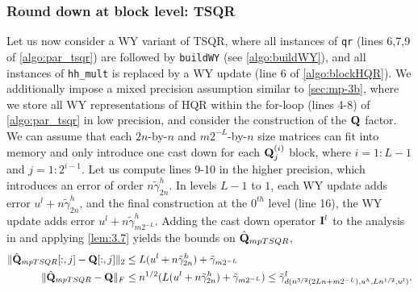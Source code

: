 \subsubsection{Round down at block level: TSQR}\label{sec:mp-3t}
Let us now consider a WY variant of TSQR, where all instances of {\tt qr} (lines 6,7,9 of \cref{algo:par_tsqr}) are followed by {\tt buildWY} (see \cref{algo:buildWY}), and all instances of {\tt hh\_mult} is replaced by a WY update (line 6 of \cref{algo:blockHQR}).
We additionally impose a mixed precision assumption similar to \cref{sec:mp-3b}, where we store all WY representations of HQR within the for-loop (lines 4-8) of \cref{algo:par_tsqr} in low precision, and consider the construction of the $\mathbf{Q}$ factor.
We can assume that each $2n$-by-$n$ and $m2^{-L}$-by-$n$ size matrices can fit into memory and only introduce one cast down for each $\mathbf{Q}_j^{(i)}$ block, where $i=1:L-1$ and $j=1:2^{i-1}$.
Let us compute lines 9-10 in the higher precision, which introduces an error of order $n\tilde{\gamma}_{2n}^h$.
In levels $L-1$ to $1$, each WY update adds error $u^l+n\tilde{\gamma}_{2n}^h$, and the final construction at the $0^{th}$ level (line 16), the WY update adds error $u^l + n\tilde{\gamma}_{m2^{-L}}^h$.
Adding the cast down operator $\mathbf{I}^l$ to the analysis in \cite{Mori2012} and applying \cref{lem:3.7} yields the bounds on $\hat{\mathbf{Q}}_{mpTSQR}$,
\begin{align}
\|\hat{\bb{Q}}_{mpTSQR}[:,j] - \bb{Q}[:,j]\|_2 &\leq L(u^l+n\tilde{\gamma}_{2n}^h)+\tilde{\gamma}_{m2^{-L}}\label{eqn:mpTSQR1}\\%
\|\hat{\bb{Q}}_{mpTSQR} - \bb{Q}\|_F &\leq n^{1/2}(L(u^l+n\tilde{\gamma}_{2n}^h)+\tilde{\gamma}_{m2^{-L}}) \leq \tilde{\gamma}_{d(n^{3/2}(2Ln+m2^{-L}), u^h, Ln^{1/2}, u^l)}^l.\label{eqn:mpTSQR2}
\end{align}

